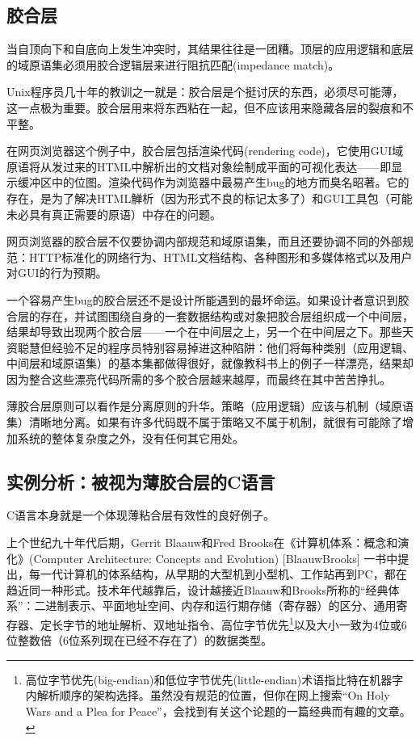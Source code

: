 \documentclass[11pt,oneside]{book}
\begin{document}
\begin{common-format}
\subsection{胶合层}
当自顶向下和自底向上发生冲突时，其结果往往是一团糟。顶层的应用逻辑和底层的域原语集必须用胶合逻辑层来进行阻抗匹配(impedance match)。

Unix程序员几十年的教训之一就是：胶合层是个挺讨厌的东西，必须尽可能薄，这一点极为重要。胶合层用来将东西粘在一起，但不应该用来隐藏各层的裂痕和不平整。

在网页浏览器这个例子中，胶合层包括渲染代码(rendering code)，它使用GUI域原语将从发过来的HTML中解析出的文档对象绘制成平面的可视化表达——即显示缓冲区中的位图。渲染代码作为浏览器中最易产生bug的地方而臭名昭著。它的存在，是为了解决HTML觯析（因为形式不良的标记太多了）和GUI工具包（可能未必具有真正需要的原语）中存在的问题。

网页浏览器的胶合层不仅要协调内部规范和域原语集，而且还要协调不同的外部规范：HTTP标准化的网络行为、HTML文档结构、各种图形和多媒体格式以及用户对GUI的行为预期。

一个容易产生bug的胶合层还不是设计所能遇到的最坏命运。如果设计者意识到胶合层的存在，并试图围绕自身的一套数据结构或对象把胶合层组织成一个中间层，结果却导致出现两个胶合层——一个在中间层之上，另一个在中间层之下。那些天资聪慧但经验不足的程序员特别容易掉进这种陷阱：他们将每种类别（应用逻辑、中间层和域原语集）的基本集都做得很好，就像教科书上的例子一样漂亮，结果却因为整合这些漂亮代码所需的多个胶合层越来越厚，而最终在其中苦苦挣扎。

薄胶合层原则可以看作是分离原则的升华。策略（应用逻辑）应该与机制（域原语集）清晰地分离。如果有许多代码既不属于策略又不属于机制，就很有可能除了增加系统的整体复杂度之外，没有任何其它用处。


\subsection{实例分析：被视为薄胶合层的C语言}
C语言本身就是一个体现薄粘合层有效性的良好例子。

上个世纪九十年代后期，Gerrit Blaauw和Fred Brooks在《计算机体系：概念和演化》(Computer Architecture:  Concepts and Evolution)  [BlaauwBrooks] 一书中提出，每一代计算机的体系结构，从早期的大型机到小型机、工作站再到PC，都在趋近同一种形式。技术年代越靠后，设计越接近Blaauw和Brooks所称的“经典体系”：二进制表示、平面地址空间、内存和运行期存储（寄存器）的区分、通用寄存器、定长字节的地址解析、双地址指令、高位字节优先\footnote{高位字节优先(big-endian)和低位字节优先(little-endian)术语指比特在机器字内解析顺序的架构选择。虽然没有规范的位置，但你在网上搜索“On Holy Wars and a Plea for Peace”，会找到有关这个论题的一篇经典而有趣的文章。}以及大小一致为4位或6位整数倍（6位系列现在已经不存在了）的数据类型。


\end{common-format}
\end{document}
